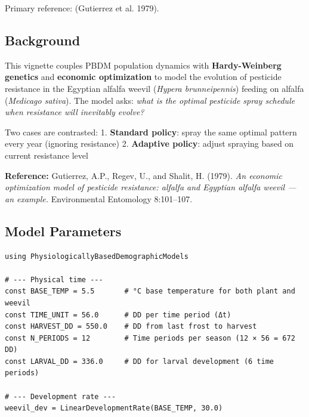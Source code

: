 Primary reference: (Gutierrez et al. 1979).



\subsection{Background}



\label{13776314717791382304}{}


This vignette couples PBDM population dynamics with \textbf{Hardy-Weinberg genetics} and \textbf{economic optimization} to model the evolution of pesticide resistance in the Egyptian alfalfa weevil (\emph{Hypera brunneipennis}) feeding on alfalfa (\emph{Medicago sativa}). The model asks: \emph{what is the optimal pesticide spray schedule when resistance will inevitably evolve?}



Two cases are contrasted: 1. \textbf{Standard policy}: spray the same optimal pattern every year (ignoring resistance) 2. \textbf{Adaptive policy}: adjust spraying based on current resistance level



\textbf{Reference:} Gutierrez, A.P., Regev, U., and Shalit, H. (1979). \emph{An economic optimization model of pesticide resistance: alfalfa and Egyptian alfalfa weevil — an example.} Environmental Entomology 8:101–107.



\subsection{Model Parameters}



\label{8409430649752429329}{}



\begin{verbatim}
using PhysiologicallyBasedDemographicModels

# --- Physical time ---
const BASE_TEMP = 5.5       # °C base temperature for both plant and weevil
const TIME_UNIT = 56.0      # DD per time period (Δt)
const HARVEST_DD = 550.0    # DD from last frost to harvest
const N_PERIODS = 12        # Time periods per season (12 × 56 = 672 DD)
const LARVAL_DD = 336.0     # DD for larval development (6 time periods)

# --- Development rate ---
weevil_dev = LinearDevelopmentRate(BASE_TEMP, 30.0)
\end{verbatim}




